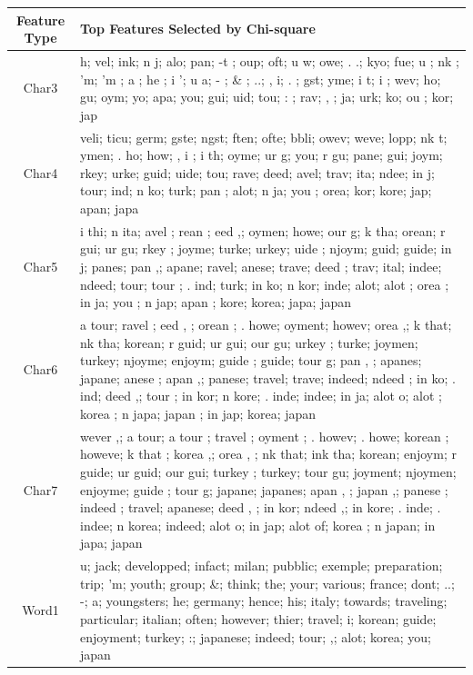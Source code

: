 \documentclass[11pt,letterpaper]{article}
\begin{document}
\cleardoublepage
\begin{table}[t]
\scriptsize
\center
\begin{tabular}{|c|p{138mm}|}
\hline
\bf Feature Type & \bf Top Features Selected by Chi-square \\
\hline
Char3 & h; vel; ink; n j; alo; pan; -t ; oup; oft; u w; owe; . .; kyo; fue;  u ; nk ;  'm; 'm ;  a ; he ; i '; u a;  - ;  \& ;  ..; , i;  .
; gst; yme; i t;  i ; wev; ho;  gu; oym;  yo; apa; you; gui; uid; tou;  : ; rav;  , ;  ja; urk;  ko; ou ; kor; jap \\
\hline
Char4 & veli; ticu; germ; gste; ngst; ften; ofte; bbli; owev; weve; lopp; nk t; ymen; . ho; how; , i ; i th; oyme; ur g;  you; r gu; pane;  gui; joym; rkey; urke; guid; uide;  tou; rave; deed; avel; trav;  ita; ndee; in j; tour; ind; n ko; turk; pan ; alot; n ja; you ; orea;  kor; kore;  jap; apan; japa \\
\hline
Char5 & i thi; n ita; avel ; rean ; eed ,; oymen; 
howe; our g; k tha; orean; r gui; ur gu; rkey ; joyme; turke; urkey; uide ; njoym;  guid; guide;  in j; panes; pan ,; apane; ravel; anese; trave; deed ;  trav;  ital; indee; ndeed;  tour; tour ; .
ind;  turk; in ko; n kor; inde;  alot; alot ; orea ; in ja;  you ; n jap; apan ;  kore; korea;  japa; japan \\
\hline
Char6 & a tour; ravel ; eed , ; orean ; . howe; oyment; howev; orea ,; k that; nk tha; korean; r guid; ur gui; our gu; urkey ;  turke; joymen; turkey; njoyme; enjoym; guide ;  guide; tour g; pan , ; apanes; japane; anese ; apan ,; panese; travel;  trave; indeed; ndeed ;  in ko;  . ind; deed ,;  tour ; in kor; n kore; . inde; indee;  in ja; alot o;  alot ; korea ; n japa; japan ; in jap;  korea;  japan \\
\hline
Char7 & wever ,;  a tour; a tour ; travel ; oyment ; . howev;  . howe; korean ; howeve; k that ; korea ,; orea , ; nk that; ink tha;  korean;  enjoym; r guide; ur guid; our gui; turkey ;  turkey; tour gu; joyment; njoymen; enjoyme;  guide ;  tour g;  japane; japanes; apan , ; japan ,; panese ; indeed ;  travel; apanese; deed , ;  in kor; ndeed ,; in kore;  . inde; . indee; n korea; indeed;  alot o;  in jap; alot of;  korea ; n japan; in japa;  japan \\
\hline
Word1 & u; jack; developped; infact; milan; pubblic; exemple; preparation; trip; 'm; youth; group; \&; think; the; your; various; france; dont; ..; -; a; youngsters; he; germany; hence; his; italy; towards; traveling; particular; italian; often; however; thier; travel; i; korean; guide; enjoyment; turkey; :; japanese; indeed; tour; ,; alot; korea; you; japan \\

\end{tabular}
\end{table}
\end{document}
